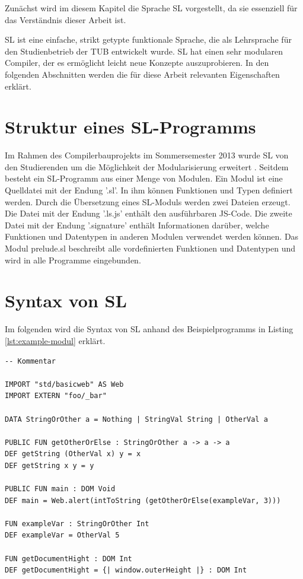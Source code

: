\documentclass[12pt,bibtotoc]{scrreprt}
\begin{document}
Zunächst wird im diesem Kapitel die Sprache SL vorgestellt, da sie essenziell für das Verständnis dieser Arbeit ist.

SL ist eine einfache, strikt getypte funktionale Sprache, die als Lehrsprache für den Studienbetrieb der \ac{TUB} entwickelt wurde. SL hat einen sehr modularen Compiler, der es ermöglicht leicht neue Konzepte auszuprobieren. In den folgenden Abschnitten werden die für diese Arbeit relevanten Eigenschaften erklärt.

\section{Struktur eines SL-Programms}

Im Rahmen des Compilerbauprojekts im Sommersemester 2013 wurde SL von den Studierenden um die Möglichkeit der Modularisierung erweitert \cite{Bisping2013}. Seitdem besteht ein SL-Programm aus einer Menge von Modulen. Ein Modul ist eine Quelldatei mit der Endung '.sl'. In ihm können Funktionen und Typen definiert werden. Durch die Übersetzung eines SL-Moduls werden zwei Dateien erzeugt. Die Datei mit der Endung '.ls.js' enthält den ausführbaren JS-Code. Die zweite Datei mit der Endung '.signature' enthält Informationen darüber, welche Funktionen und Datentypen in anderen Modulen verwendet werden können. Das Modul prelude.sl beschreibt alle vordefinierten Funktionen und Datentypen und wird in alle Programme eingebunden. 

\section{Syntax von SL}

Im folgenden wird die Syntax von SL anhand des Beispielprogramms in Listing \ref{lst:example-modul} erklärt.

\begin{lstlisting}[caption=Beispielmodul, label=lst:example-modul, float=h]
-- Kommentar

IMPORT "std/basicweb" AS Web
IMPORT EXTERN "foo/_bar"

DATA StringOrOther a = Nothing | StringVal String | OtherVal a

PUBLIC FUN getOtherOrElse : StringOrOther a -> a -> a
DEF getString (OtherVal x) y = x
DEF getString x y = y

PUBLIC FUN main : DOM Void
DEF main = Web.alert(intToString (getOtherOrElse(exampleVar, 3)))

FUN exampleVar : StringOrOther Int
DEF exampleVar = OtherVal 5

FUN getDocumentHight : DOM Int
DEF getDocumentHight = {| window.outerHeight |} : DOM Int

\end{lstlisting}
\end{document}
